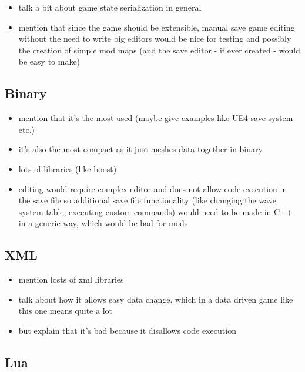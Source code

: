 \begin{itemize}
    \item talk a bit about game state serialization in general
    \item mention that since the game should be extensible, manual save game
	    editing without the need to write big editors would be nice
	    for testing and possibly the creation of simple mod maps
	    (and the save editor - if ever created - would be easy to make)
\end{itemize}

\subsection{Binary}

\begin{itemize}
    \item mention that it's the most used
	    (maybe give examples like UE4 save system etc.)
    \item it's also the most compact as it just meshes data together in binary
    \item lots of libraries (like boost)
    \item editing would require complex editor and does not allow code execution in the
	    save file so additional save file functionality (like changing the wave
	    system table, executing custom commands) would need to be made in C++
	    in a generic way, which would be bad for mods
\end{itemize}

\subsection{XML}

\begin{itemize}
    \item mention losts of xml libraries
    \item talk about how it allows easy data change, which in a data driven game like this
	    one means quite a lot
    \item but explain that it's bad because it disallows code execution
\end{itemize}

\subsection{Lua}

